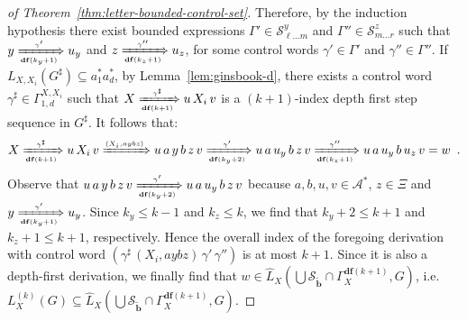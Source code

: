 \documentclass[final]{llncs}
\newcommand{\xArrow}[2]{\xRightarrow[{\scriptscriptstyle #2}]{{\scriptscriptstyle #1}}}
\def\patt{{\widetilde{\mathbf{b}}}}
\def\df#1{\scriptscriptstyle\mathbf{df}(#1)}
\def\Vars{\ensuremath{\Xi}}
\begin{document}
\begin{proof}[of Theorem~\ref{thm:letter-bounded-control-set}]
Therefore, by the induction hypothesis there exist bounded expressions
\(\Gamma' \in \mathcal{S}^y_{\ell \ldots m}\) and \(\Gamma'' \in \mathcal{S}^z_{m \ldots r}\) 
such that
$y \xArrow{\gamma'}{\df{k_y+1}} u_y$ and $z
\xArrow{\gamma''}{\df{k_z+1}} u_z$, for some control words 
\(\gamma'\in\Gamma'\) and \(\gamma''\in\Gamma''\). 
If $L_{X,X_i}(G^\sharp) \subseteq a_1^*a_d^*$, by Lemma~\ref{lem:ginsbook-d}, 
there exists a control word $\gamma^\sharp \in \Gamma_{1,d}^{X,X_i}$ such that 
\(X \xArrow{\gamma^\sharp}{\df{k+1}} u \, X_i \, v\) is a
\((k+1)\)-index depth first step sequence in \(G^\sharp\). 
It follows that:
\[
X \xArrow{\gamma^\sharp}{\df{k+1}} u \, X_i \, v 
\xArrow{(X_i,aybz)}{} u\, a\, y\, b\, z\, v
\xArrow{\gamma'}{\df{k_y+2}} u\, a\, u_y\, b\, z\, v
\xArrow{\gamma''}{\df{k_z+1}} u\, a\, u_y\, b\, u_z\, v = w\enspace .
\]
Observe that \( u\, a\, y\, b\, z\, v \xArrow{\gamma'}{\df{k_y+2}}
u\, a\, u_y\, b\, z\, v\)
because \(a,b,u,v \in \mathcal{A}^*\), \(z \in \Vars\) and \(
y \xArrow{\gamma'}{\df{k_y+1}} u_y\).  Since \(k_y\leq k-1\)
and \(k_z\leq k\), we find that \(k_y+2 \leq k+1\) and \(k_z+1\leq
k+1\), respectively.  Hence the overall index of the foregoing
derivation with control word \( (\gamma^\sharp\,
(X_i,aybz)\, \gamma'\, \gamma'')\) is at most \(k+1\).
Since it is also a depth-first derivation, we finally find
that \(w\in \hat{L}_{X}(\bigcup\mathcal{S}_\patt\cap \Gamma_X^{\df{k+1}}, G)\), i.e.\ 
\(L^{(k)}_X(G) \subseteq \hat{L}_{X}(\bigcup\mathcal{S}_\patt\cap \Gamma_X^{\df{k+1}}, G)\).



\end{proof}
\end{document}
